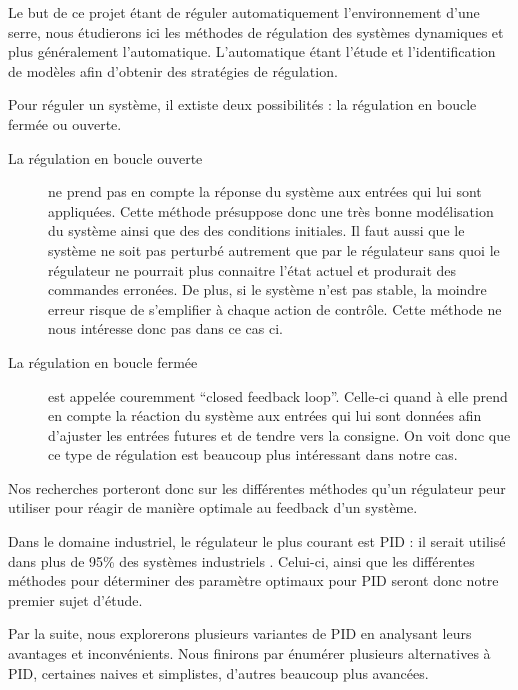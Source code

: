 
Le but de ce projet étant de réguler automatiquement l'environnement d'une serre,
nous étudierons ici les méthodes de régulation des systèmes dynamiques et plus généralement l'automatique.
L'automatique étant l'étude et l'identification de modèles afin d'obtenir des stratégies de régulation.

Pour réguler un système, il extiste deux possibilités : la régulation en boucle fermée ou ouverte.

\begin{description}
\item[La régulation en boucle ouverte] ne prend pas en compte la réponse du système aux entrées qui lui sont appliquées. Cette méthode présuppose donc une très bonne modélisation du système ainsi que des des conditions initiales.
Il faut aussi que le système ne soit pas perturbé autrement que par le régulateur sans quoi le régulateur ne pourrait plus connaitre l'état actuel et produrait des commandes erronées.
De plus, si le système n'est pas stable, la moindre erreur risque de s'emplifier à chaque action de contrôle.
Cette méthode ne nous intéresse donc pas dans ce cas ci.

\item[La régulation en boucle fermée] est appelée couremment ``closed feedback loop''.
Celle-ci quand à elle prend en compte la réaction du système aux entrées qui lui sont données afin d'ajuster les entrées futures et de tendre vers la consigne.
On voit donc que ce type de régulation est beaucoup plus intéressant dans notre cas.
\end{description}

Nos recherches porteront donc sur les différentes méthodes qu'un régulateur peur utiliser pour réagir de manière optimale au feedback d'un système.


Dans le domaine industriel, le régulateur le plus courant est PID : il serait utilisé dans plus de 95\% des systèmes industriels \cite{Kinnaert2013}.
Celui-ci, ainsi que les différentes méthodes pour déterminer des paramètre optimaux pour PID seront donc notre premier sujet d'étude.

Par la suite, nous explorerons plusieurs variantes de PID en analysant leurs avantages et inconvénients.
Nous finirons par énumérer plusieurs alternatives à PID, certaines naives et simplistes, d'autres beaucoup plus avancées.
